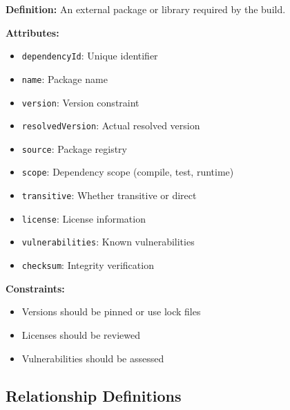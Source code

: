 \documentclass[11pt,letterpaper]{article}
\begin{document}
\begin{definitionbox}
\textbf{Definition:} An external package or library required by the build.

\textbf{Attributes:}
\begin{itemize}[nosep]
    \item \texttt{dependencyId}: Unique identifier
    \item \texttt{name}: Package name
    \item \texttt{version}: Version constraint
    \item \texttt{resolvedVersion}: Actual resolved version
    \item \texttt{source}: Package registry
    \item \texttt{scope}: Dependency scope (compile, test, runtime)
    \item \texttt{transitive}: Whether transitive or direct
    \item \texttt{license}: License information
    \item \texttt{vulnerabilities}: Known vulnerabilities
    \item \texttt{checksum}: Integrity verification
\end{itemize}

\textbf{Constraints:}
\begin{itemize}[nosep]
    \item Versions should be pinned or use lock files
    \item Licenses should be reviewed
    \item Vulnerabilities should be assessed
\end{itemize}
\end{definitionbox}

\subsection{Relationship Definitions}
\end{document}
